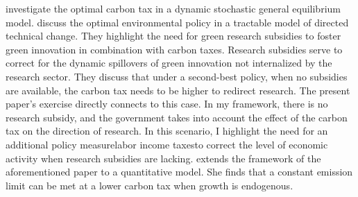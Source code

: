  \cite{Golosov2014OptimalEquilibrium} investigate the optimal carbon tax in a dynamic stochastic general equilibrium model.  
\cite{Acemoglu2012TheChange} discuss the optimal environmental policy in a tractable model of directed technical change.
They highlight the need for green research subsidies to foster green innovation in combination with carbon taxes. Research subsidies serve to correct for the dynamic spillovers of green innovation not internalized by the research sector. They discuss that under a second-best policy, when no subsidies are available, the carbon tax needs to be higher to redirect research. The present paper's exercise 
directly connects to this case. In my framework, there is no research subsidy, and the government takes into account the effect of the carbon tax on the direction of research. In this scenario, I highlight the need for an additional policy measure\textemdash labor income taxes\textemdash to correct the level of economic activity when research subsidies are lacking. 
\cite{Fried2018ClimateAnalysis} extends the framework of the aforementioned paper to a quantitative model. %
She finds that a constant emission limit can be met at a lower carbon tax when growth is endogenous. %



